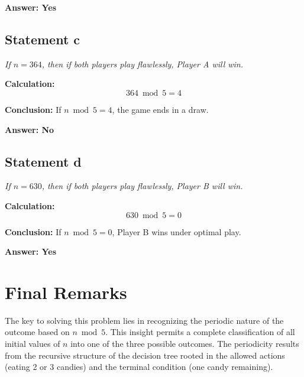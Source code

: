 \documentclass[12pt]{article}
\begin{document}
\textbf{Answer: Yes}

\subsection{Statement c}

\textit{If $n = 364$, then if both players play flawlessly, Player A will win.}

\textbf{Calculation:}
\[
364 \bmod 5 = 4
\]

\textbf{Conclusion:} If $n \bmod 5 = 4$, the game ends in a draw.

\textbf{Answer: No}

\subsection{Statement d}

\textit{If $n = 630$, then if both players play flawlessly, Player B will win.}

\textbf{Calculation:}
\[
630 \bmod 5 = 0
\]

\textbf{Conclusion:} If $n \bmod 5 = 0$, Player B wins under optimal play.

\textbf{Answer: Yes}

\section{Final Remarks}

The key to solving this problem lies in recognizing the periodic nature of the outcome based on $n \bmod 5$. This insight permits a complete classification of all initial values of $n$ into one of the three possible outcomes. The periodicity results from the recursive structure of the decision tree rooted in the allowed actions (eating 2 or 3 candies) and the terminal condition (one candy remaining).
\end{document}

